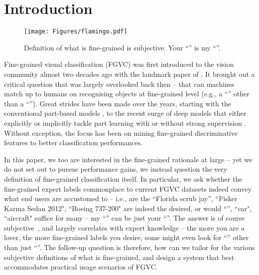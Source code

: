 \documentclass[final]{cvpr}
\begin{document}
\vspace{-10mm}
\section{Introduction}

\begin{figure}[t]
\begin{center}
\texttt{[image: Figures/flamingo.pdf]}
\end{center}

  \caption{Definition of what is fine-grained is subjective. Your ``'' is my ``''.}
\label{fig:Labrador}
\vspace{-5mm}
\end{figure}
Fine-grained visual classification (FGVC) was first introduced to the vision community almost two decades ago with the landmark paper of \cite{biederman1999subordinate}. It brought out a critical question that was largely overlooked back then -- that can machines match up to humans on recognising objects at fine-grained level (e.g., a ``'' other than a ``''). Great strides have been made over the years, starting with the conventional part-based models \cite{yao2012codebook,gao2013learning,berg2013poof,branson2014bird}, to the recent surge of deep models that either explicitly or implicitly tackle part learning with or without strong supervision \cite{lin2015bilinear,Peng2018Object,zhang2016picking,zheng2017learning,Zheng_2019_CVPR,wu2019leveraging}. Without exception, the focus has been on mining fine-grained discriminative features to better classification performances.

In this paper, we too are interested in the fine-grained rationale at large -- yet we do not set out to pursue performance gains,  we instead question the very definition of fine-grained classification itself. In particular, we ask whether the fine-grained expert labels commonplace to current FGVC datasets indeed convey what end users are accustomed to -- i.e., are the ``Florida scrub jay'', ``Fisker Karma Sedan 2012", ``Boeing 737-200" are indeed the desired, or would  ``'', ``car", ``aircraft" suffice for many -- my ``'' can be just your ``''. The answer is of course subjective~\cite{ordonez2015predicting}, and largely correlates with expert knowledge -- the more you are a  lover, the more fine-grained labels you desire, some might even look for ``'' other than just ``''. The follow-up question is therefore, how can we tailor for the various subjective definitions of what is fine-grained, and design a system that best accommodates practical usage scenarios of FGVC. 
\end{document}
